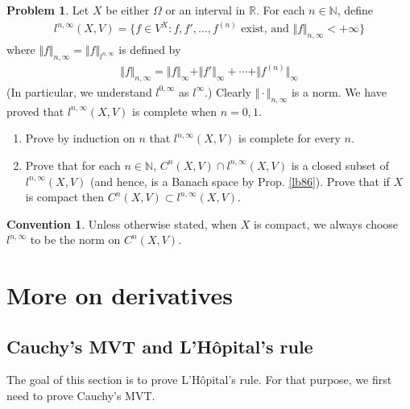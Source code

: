 \documentclass[12pt,b5paper,notitlepage]{article}
\theoremstyle{definition}
\newtheorem{cv}[df]{Convention}
\newtheorem{prob}{\color{red}Problem}[section]
\theoremstyle{plain}
\newcommand{\Nbb}{\mathbb N}
\newcommand{\Rbb}{\mathbb R}
\numberwithin{equation}{section}
\begin{document}
\begin{prob}\label{lb355}
Let $X$ be either $\Omega$ or an interval in $\Rbb$. For each $n\in\Nbb$, define 
\begin{align*}
l^{n,\infty}(X,V)=\{f\in V^X:f,f',\dots,f^{(n)}\text{ exist, and }\Vert f\Vert_{n,\infty}<+\infty\}
\end{align*}
where $\Vert f\Vert_{n,\infty}=\Vert f\Vert_{l^{n,\infty}}$ is defined by
\begin{align*}
\Vert f\Vert_{n,\infty}=\Vert f\Vert_\infty+\Vert f'\Vert_\infty+\cdots+\Vert f^{(n)}\Vert_\infty
\end{align*}
(In particular, we understand $l^{0,\infty}$ as $l^\infty$.) Clearly $\Vert\cdot\Vert_{n,\infty}$ is a norm. We have proved that $l^{n,\infty}(X,V)$ is complete when $n=0,1$. 
\begin{enumerate}
\item Prove by induction on $n$ that $l^{n,\infty}(X,V)$ is complete for every $n$.
\item Prove that for each $n\in\Nbb$, $C^n(X,V)\cap l^{n,\infty}(X,V)$ is a closed subset of $l^{n,\infty}(X,V)$ (and hence, is a Banach space by Prop. \ref{lb86}).  Prove that if $X$ is compact then $C^n(X,V)\subset l^{n,\infty}(X,V)$.
\end{enumerate}
\end{prob}







\begin{cv}
Unless otherwise stated, when $X$ is compact, we always choose $l^{n,\infty}$ to be the norm on $C^n(X,V)$.
\end{cv}








\newpage




\section{More on derivatives}

\subsection{Cauchy's MVT and L'H\^opital's rule}


The goal of this section is to prove L'H\^opital's rule. For that purpose, we first need to prove Cauchy's MVT.
\end{document}
